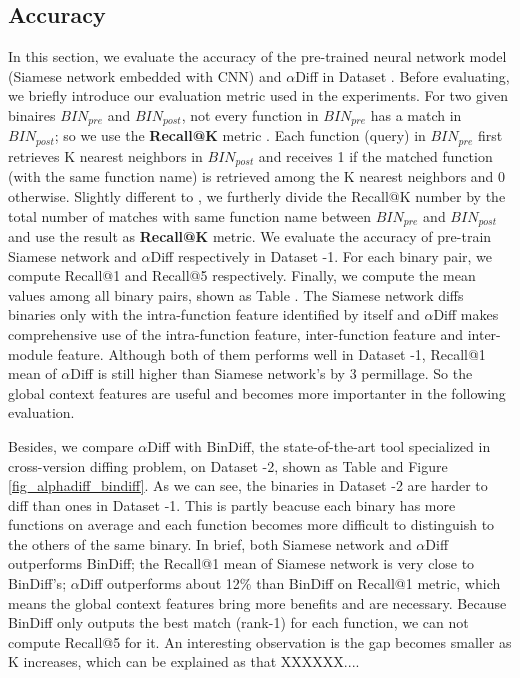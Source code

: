 \subsection{Accuracy}
In this section, we evaluate the accuracy of the pre-trained neural network model (Siamese network embedded with CNN) and $\alpha$Diff in Dataset \uppercase\expandafter{}.
Before evaluating, we briefly introduce our evaluation metric used in the experiments. 
For two given binaires $BIN_{pre}$ and $BIN_{post}$, not every function in $BIN_{pre}$ has a match in $BIN_{post}$; 
so we use the \textbf{Recall@K} metric \cite{jegou2011product}\cite{song2016deep}. 
Each function (query) in $BIN_{pre}$ first retrieves K nearest neighbors in $BIN_{post}$ and receives 1 if the matched function (with the same function name) is retrieved among the K nearest
 neighbors and 0 otherwise. 
Slightly different to \cite{jegou2011product}\cite{song2016deep}, we furtherly divide the Recall@K number by the total number of matches with same function name between $BIN_{pre}$ and $BIN_{post}$
 and use the result as \textbf{Recall@K} metric.
We evaluate the accuracy of pre-train Siamese network and $\alpha$Diff respectively in Dataset \uppercase\expandafter{}-1.
 For each binary pair, we compute Recall@1 and Recall@5 respectively. Finally, we compute the mean values among all binary pairs, shown as Table \uppercase\expandafter{}.
 The Siamese network diffs binaries only with the intra-function feature identified by itself and $\alpha$Diff
  makes comprehensive use of the intra-function feature, inter-function feature and inter-module feature.
  Although both of them performs well in Dataset \uppercase\expandafter{}-1, 
  Recall@1 mean of $\alpha$Diff is still higher than Siamese network's by 3 permillage. 
  So the global context features are useful and becomes more importanter in the following evaluation.  

Besides, we compare $\alpha$Diff with BinDiff, the state-of-the-art tool specialized in cross-version diffing problem, on Dataset \uppercase\expandafter{}-2, shown as Table \uppercase\expandafter{} and Figure \ref{fig_alphadiff_bindiff}.
 As we can see, the binaries in Dataset \uppercase\expandafter{}-2 are harder to diff than ones in Dataset \uppercase\expandafter{}-1.
 This is partly beacuse each binary has more functions on average and each function becomes more difficult to distinguish to the others of the same binary.
 In brief, both Siamese network and $\alpha$Diff outperforms BinDiff; the Recall@1 mean of Siamese network is very close to BinDiff's;
 $\alpha$Diff outperforms about 12\% than BinDiff on Recall@1 metric, which means the global context features bring more benefits and are necessary. 
 Because BinDiff only outputs the best match (rank-1) for each function, we can not compute Recall@5 for it. 
 An interesting observation is the gap becomes smaller as K increases, which can be explained as that {\color{red}XXXXXX...}.

